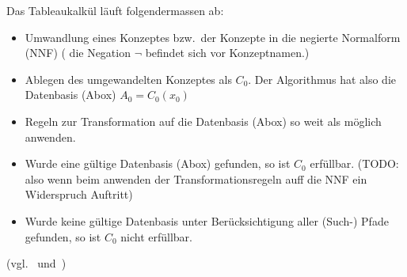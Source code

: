 \begin{table}[H]
\centering
{}\hfill
{}
\end{table}

Das Tableaukalkül läuft folgendermassen ab:
\begin{itemize}
    \item Umwandlung eines Konzeptes bzw.\ der Konzepte in die negierte Normalform (NNF) ( die Negation $ \neg $ befindet sich vor Konzeptnamen.)
    \item Ablegen des umgewandelten Konzeptes als $ C_0 $.
        Der Algorithmus hat also die Datenbasis (Abox) $ A_0 = {C_0(x_0)} $
    \item Regeln zur Transformation auf die Datenbasis (Abox) so weit als möglich anwenden.
    \item Wurde eine gültige Datenbasis (Abox) gefunden, so ist $ C_0 $ erfüllbar. (TODO: also wenn beim anwenden der Transformationsregeln auff die NNF ein Widerspruch Auftritt)
    \item Wurde keine gültige Datenbasis unter Berücksichtigung aller (Such-) Pfade gefunden, so ist $ C_0 $ nicht erfüllbar.
\end{itemize} (vgl.~\cite{horrocks2002} und~\cite{horrocks2005})



